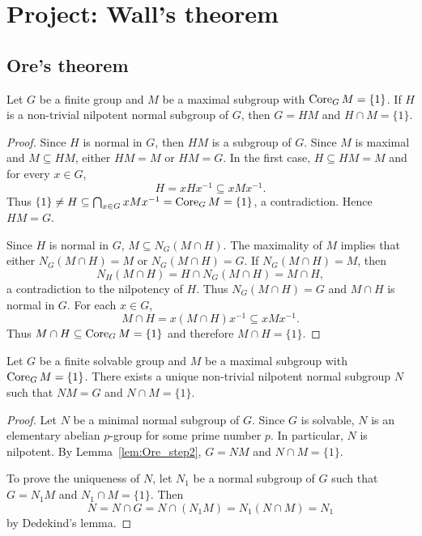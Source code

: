 \section{Project: Wall's theorem}

\subsection{Ore's theorem}

\begin{lemma}
    \label{lem:Ore_step1}
    Let $G$ be a finite group and $M$ be a maximal subgroup with 
    $\operatorname{Core}_GM=\{1\}$. If $H$ is a non-trivial nilpotent 
    normal subgroup of $G$, then $G=HM$ and $H\cap M=\{1\}$. 
\end{lemma}

\begin{proof}
    Since $H$ is normal in $G$, then $HM$ is a subgroup of $G$. Since $M$ 
    is maximal and $M\subseteq HM$, either $HM=M$ or $HM=G$. In the first case, 
    $H\subseteq HM=M$ and for every $x\in G$, 
    \[
    H=xHx^{-1}\subseteq xMx^{-1}.
    \]
    Thus $\{1\}\ne H\subseteq\bigcap_{x\in G}xMx^{-1}=\operatorname{Core}_GM=\{1\}$, a contradiction. 
    Hence $HM=G$. 

    Since $H$ is normal in $G$, $M\subseteq N_G(M\cap H)$. The maximality of $M$ implies that  
    either $N_G(M\cap H)=M$ or $N_G(M\cap H)=G$. If $N_G(M\cap H)=M$, then 
    \[
    N_H(M\cap H)=H\cap N_G(M\cap H)=M\cap H,
    \]
    a contradiction to the nilpotency of $H$. Thus $N_G(M\cap H)=G$ and 
    $M\cap H$ is normal in $G$. For each $x\in G$, 
    \[
    M\cap H=x(M\cap H)x^{-1}\subseteq xMx^{-1}.
    \]
    Thus $M\cap H\subseteq\operatorname{Core}_GM=\{1\}$ and therefore $M\cap H=\{1\}$. 
\end{proof}

\begin{lemma}
\label{lem:Ore_step2}
    Let $G$ be a finite solvable group and $M$ be a maximal subgroup with 
    $\operatorname{Core}_GM=\{1\}$. There exists a unique 
    non-trivial nilpotent normal subgroup $N$ such that 
    $NM=G$ and $N\cap M=\{1\}$.   
\end{lemma}

\begin{proof}
    Let $N$ be a minimal normal subgroup of $G$. Since $G$ is solvable, 
    $N$ is an elementary abelian $p$-group for some prime number $p$. 
    In particular, $N$ is nilpotent. By Lemma~\ref{lem:Ore_step2}, 
    $G=NM$ and $N\cap M=\{1\}$. 

    To prove the uniqueness of $N$, let $N_1$ be a normal
    subgroup of $G$ such that $G=N_1M$ and $N_1\cap M=\{1\}$. Then
    \[
    N=N\cap G=N\cap (N_1M)=N_1(N\cap M)=N_1
    \]
    by Dedekind's lemma. 
\end{proof}

